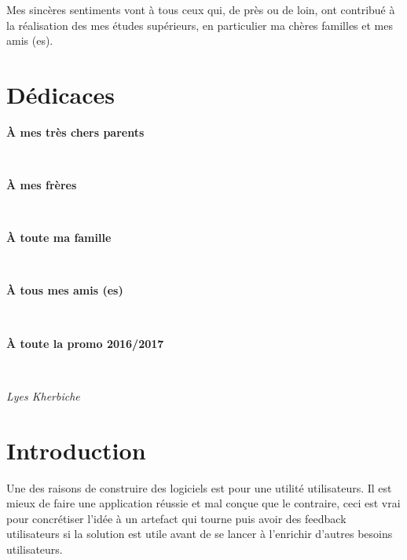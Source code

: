 \documentclass[12pt, a4paper, openany]{report}
\begin{document}
   Mes sincères sentiments vont à tous ceux qui, de près ou de loin, ont contribué à la réalisation des mes études supérieurs, en particulier ma chères familles et mes amis (es).\\
   
   
\chapter*{Dédicaces}
\begin{center}
\begin{Large} \textbf{À mes très chers parents} \end{Large}\\ 
\begin{Large} \textbf{À mes frères} \end{Large}\\
\begin{Large} \textbf{À toute ma famille} \end{Large}\\
\begin{Large} \textbf{À tous mes amis (es)} \end{Large} \\ 
\begin{Large} \textbf{À toute la promo 2016/2017} \end{Large}\\
\end{center}
\begin{flushright} \begin{Large} \textit{Lyes Kherbiche} \end{Large} \end{flushright}

\tableofcontents
\listoffigures
\listoftables



\chapter*{Introduction}
 
  Une des raisons de construire des logiciels est pour une utilité utilisateurs. Il est mieux de faire une application réussie et mal conçue que le contraire, ceci est vrai pour concrétiser l'idée à un artefact qui tourne puis avoir des feedback utilisateurs si la solution est utile avant de se lancer à l’enrichir d'autres besoins utilisateurs. \\
  
\end{document}
